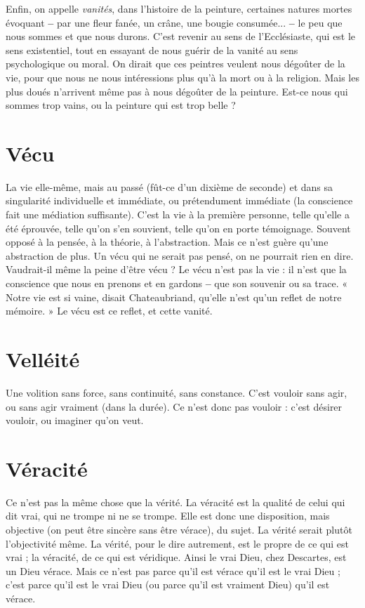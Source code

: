 Enfin, on appelle {\it vanités}, dans l’histoire de la peinture, certaines natures
mortes évoquant {\bf --} par une fleur fanée, un crâne, une bougie consumée... {\bf --} le
peu que nous sommes et que nous durons. C’est revenir au sens de l’Ecclésiaste,
qui est le sens existentiel, tout en essayant de nous guérir de la vanité au sens
psychologique ou moral. On dirait que ces peintres veulent nous dégoûter de
la vie, pour que nous ne nous intéressions plus qu’à la mort ou à la religion.
Mais les plus doués n’arrivent même pas à nous dégoûter de la peinture. Est-ce
nous qui sommes trop vains, ou la peinture qui est trop belle ?

\section{Vécu}
La vie elle-même, mais au passé (fût-ce d’un dixième de seconde) et
dans sa singularité individuelle et immédiate, ou prétendument
immédiate (la conscience fait une médiation suffisante). C’est la vie à la première
personne, telle qu’elle a été éprouvée, telle qu’on s’en souvient, telle
qu’on en porte témoignage. Souvent opposé à la pensée, à la théorie, à l’abstraction.
Mais ce n’est guère qu’une abstraction de plus. Un vécu qui ne serait
pas pensé, on ne pourrait rien en dire. Vaudrait-il même la peine d’être vécu ?
Le vécu n’est pas la vie : il n’est que la conscience que nous en prenons et
en gardons {\bf --} que son souvenir ou sa trace. « Notre vie est si vaine, disait Chateaubriand,
qu’elle n’est qu’un reflet de notre mémoire. » Le vécu est ce reflet,
et cette vanité.

\section{Velléité}
Une volition sans force, sans continuité, sans constance. C’est
vouloir sans agir, ou sans agir vraiment (dans la durée). Ce n’est
donc pas vouloir : c’est désirer vouloir, ou imaginer qu’on veut.

\section{Véracité}
Ce n’est pas la même chose que la vérité. La véracité est la qualité
de celui qui dit vrai, qui ne trompe ni ne se trompe. Elle est
donc une disposition, mais objective (on peut être sincère sans être vérace), du
sujet. La vérité serait plutôt l’objectivité même. La vérité, pour le dire autrement,
est le propre de ce qui est vrai ; la véracité, de ce qui est véridique. Ainsi
le vrai Dieu, chez Descartes, est un Dieu vérace. Mais ce n’est pas parce qu’il
est vérace qu’il est le vrai Dieu ; c’est parce qu’il est le vrai Dieu (ou parce qu’il
est vraiment Dieu) qu’il est vérace.


